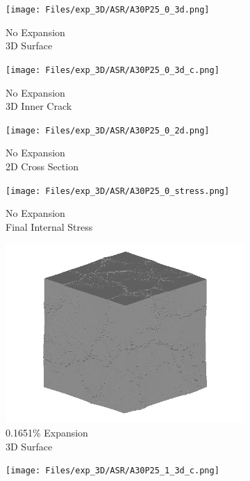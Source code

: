 \begin{figure}[ht!]
\centering
    \begin{subfigure}{.25\textwidth}
      \centering
      \texttt{[image: Files/exp\_3D/ASR/A30P25\_0\_3d.png]}
      \caption{No Expansion\\3D Surface}
    \end{subfigure}%
    \begin{subfigure}{.25\textwidth}
      \centering
      \texttt{[image: Files/exp\_3D/ASR/A30P25\_0\_3d\_c.png]}
      \caption{No Expansion\\3D Inner Crack}
    \end{subfigure}%
    \begin{subfigure}{.25\textwidth}
      \centering
      \texttt{[image: Files/exp\_3D/ASR/A30P25\_0\_2d.png]}
      \caption{No Expansion\\2D Cross Section}
    \end{subfigure}%
    \begin{subfigure}{.25\textwidth}
      \centering
      \texttt{[image: Files/exp\_3D/ASR/A30P25\_0\_stress.png]}
      \caption{No Expansion\\Final Internal Stress}
    \end{subfigure}
    \begin{subfigure}{.25\textwidth}
      \centering
      \includegraphics[width=.8\linewidth]{Files/exp_3D/ASR/A30P25_1_3d.png}
      \caption{0.1651\% Expansion\\3D Surface}
    \end{subfigure}%
    \begin{subfigure}{.25\textwidth}
      \centering
      \texttt{[image: Files/exp\_3D/ASR/A30P25\_1\_3d\_c.png]}

\end{subfigure}
\end{figure}
